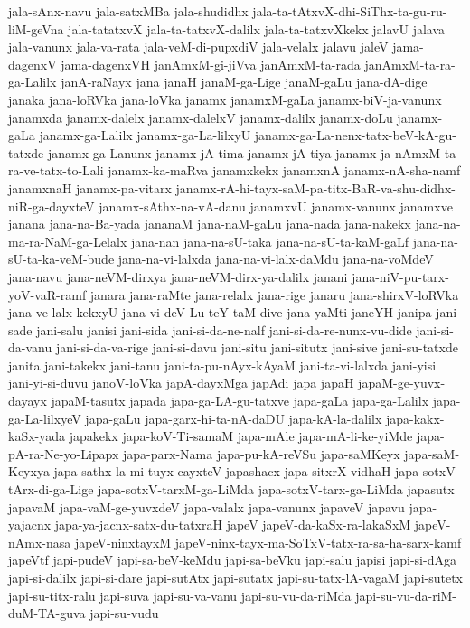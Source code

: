 {jala-sAnx-navu
jala-satxMBa
jala-shudidhx
jala-ta-tAtxvX-dhi-SiThx-ta-gu-ru-liM-geVna
jala-tatatxvX
jala-ta-tatxvX-dalilx
jala-ta-tatxvXkekx
jalavU
jalava
jala-vanunx
jala-va-rata
jala-veM-di-pupxdiV
jala-velalx
jalavu
jaleV
jama-dagenxV
jama-dagenxVH
janAmxM-gi-jiVva
janAmxM-ta-rada
janAmxM-ta-ra-ga-Lalilx
janA-raNayx
jana
janaH
janaM-ga-Lige
janaM-gaLu
jana-dA-dige
janaka
jana-loRVka
jana-loVka
janamx
janamxM-gaLa
janamx-biV-ja-vanunx
janamxda
janamx-dalelx
janamx-dalelxV
janamx-dalilx
janamx-doLu
janamx-gaLa
janamx-ga-Lalilx
janamx-ga-La-lilxyU
janamx-ga-La-nenx-tatx-beV-kA-gu-tatxde
janamx-ga-Lanunx
janamx-jA-tima
janamx-jA-tiya
janamx-ja-nAmxM-ta-ra-ve-tatx-to-Lali
janamx-ka-maRva
janamxkekx
janamxnA
janamx-nA-sha-namf
janamxnaH
janamx-pa-vitarx
janamx-rA-hi-tayx-saM-pa-titx-BaR-va-shu-didhx-niR-ga-dayxteV
janamx-sAthx-na-vA-danu
janamxvU
janamx-vanunx
janamxve
janana
jana-na-Ba-yada
jananaM
jana-naM-gaLu
jana-nada
jana-nakekx
jana-na-ma-ra-NaM-ga-Lelalx
jana-nan
jana-na-sU-taka
jana-na-sU-ta-kaM-gaLf
jana-na-sU-ta-ka-veM-bude
jana-na-vi-lalxda
jana-na-vi-lalx-daMdu
jana-na-voMdeV
jana-navu
jana-neVM-dirxya
jana-neVM-dirx-ya-dalilx
janani
jana-niV-pu-tarx-yoV-vaR-ramf
janara
jana-raMte
jana-relalx
jana-rige
janaru
jana-shirxV-loRVka
jana-ve-lalx-kekxyU
jana-vi-deV-Lu-teY-taM-dive
jana-yaMti
janeYH
janipa
jani-sade
jani-salu
janisi
jani-sida
jani-si-da-ne-nalf
jani-si-da-re-nunx-vu-dide
jani-si-da-vanu
jani-si-da-va-rige
jani-si-davu
jani-situ
jani-situtx
jani-sive
jani-su-tatxde
janita
jani-takekx
jani-tanu
jani-ta-pu-nAyx-kAyaM
jani-ta-vi-lalxda
jani-yisi
jani-yi-si-duvu
janoV-loVka
japA-dayxMga
japAdi
japa
japaH
japaM-ge-yuvx-dayayx
japaM-tasutx
japada
japa-ga-LA-gu-tatxve
japa-gaLa
japa-ga-Lalilx
japa-ga-La-lilxyeV
japa-gaLu
japa-garx-hi-ta-nA-daDU
japa-kA-la-dalilx
japa-kakx-kaSx-yada
japakekx
japa-koV-Ti-samaM
japa-mAle
japa-mA-li-ke-yiMde
japa-pA-ra-Ne-yo-Lipapx
japa-parx-Nama
japa-pu-kA-reVSu
japa-saMKeyx
japa-saM-Keyxya
japa-sathx-la-mi-tuyx-cayxteV
japashacx
japa-sitxrX-vidhaH
japa-sotxV-tArx-di-ga-Lige
japa-sotxV-tarxM-ga-LiMda
japa-sotxV-tarx-ga-LiMda
japasutx
japavaM
japa-vaM-ge-yuvxdeV
japa-valalx
japa-vanunx
japaveV
japavu
japa-yajacnx
japa-ya-jacnx-satx-du-tatxraH
japeV
japeV-da-kaSx-ra-lakaSxM
japeV-nAmx-nasa
japeV-ninxtayxM
japeV-ninx-tayx-ma-SoTxV-tatx-ra-sa-ha-sarx-kamf
japeVtf
japi-pudeV
japi-sa-beV-keMdu
japi-sa-beVku
japi-salu
japisi
japi-si-dAga
japi-si-dalilx
japi-si-dare
japi-sutAtx
japi-sutatx
japi-su-tatx-lA-vagaM
japi-sutetx
japi-su-titx-ralu
japi-suva
japi-su-va-vanu
japi-su-vu-da-riMda
japi-su-vu-da-riM-duM-TA-guva
japi-su-vudu
}
